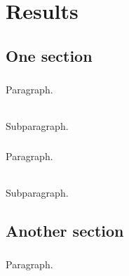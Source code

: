 \chapter{Results}
\label{cha:results}

\section{One section}
\label{sec:one}
\paragraph{}
Paragraph.

\subparagraph{}
Subparagraph.

\paragraph{}
Paragraph.

\subparagraph{}
Subparagraph.

\section{Another section}
\label{sec:another}
\paragraph{}
Paragraph.